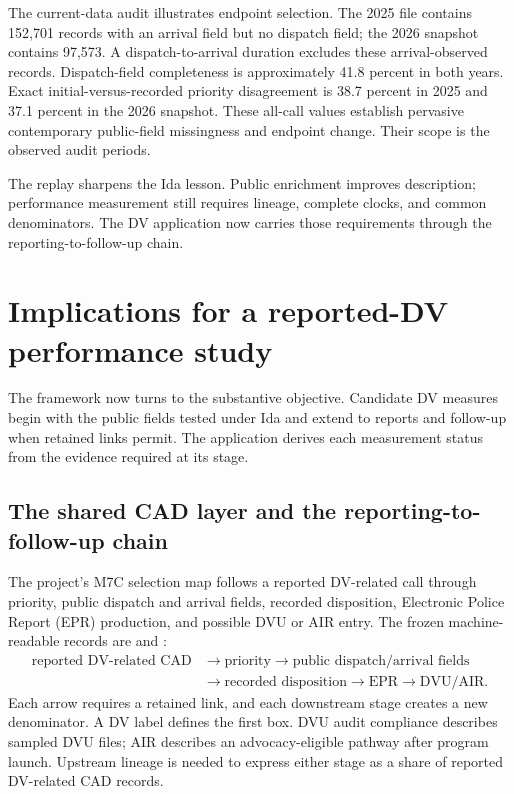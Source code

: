 \documentclass[11pt]{article}
\begin{document}
The current-data audit illustrates endpoint selection. The 2025 file contains 152,701 records with an arrival field but no dispatch field; the 2026 snapshot contains 97,573. A dispatch-to-arrival duration excludes these arrival-observed records. Dispatch-field completeness is approximately 41.8 percent in both years. Exact initial-versus-recorded priority disagreement is 38.7 percent in 2025 and 37.1 percent in the 2026 snapshot. These all-call values establish pervasive contemporary public-field missingness and endpoint change. Their scope is the observed audit periods.

The replay sharpens the Ida lesson. Public enrichment improves description; performance measurement still requires lineage, complete clocks, and common denominators. The DV application now carries those requirements through the reporting-to-follow-up chain.

\section{Implications for a reported-DV performance study}

The framework now turns to the substantive objective. Candidate DV measures begin with the public fields tested under Ida and extend to reports and follow-up when retained links permit. The application derives each measurement status from the evidence required at its stage.

\subsection{The shared CAD layer and the reporting-to-follow-up chain}

The project's M7C selection map follows a reported DV-related call through priority, public dispatch and arrival fields, recorded disposition, Electronic Police Report (EPR) production, and possible DVU or AIR entry. The frozen machine-readable records are  and :
\begin{equation*}
\begin{aligned}
\text{reported DV-related CAD}
&\rightarrow \text{priority}
\rightarrow \text{public dispatch/arrival fields}\\
&\rightarrow \text{recorded disposition}
\rightarrow \text{EPR}
\rightarrow \text{DVU/AIR}.
\end{aligned}
\end{equation*}
Each arrow requires a retained link, and each downstream stage creates a new denominator. A DV label defines the first box. DVU audit compliance describes sampled DVU files; AIR describes an advocacy-eligible pathway after program launch. Upstream lineage is needed to express either stage as a share of reported DV-related CAD records.
\end{document}
